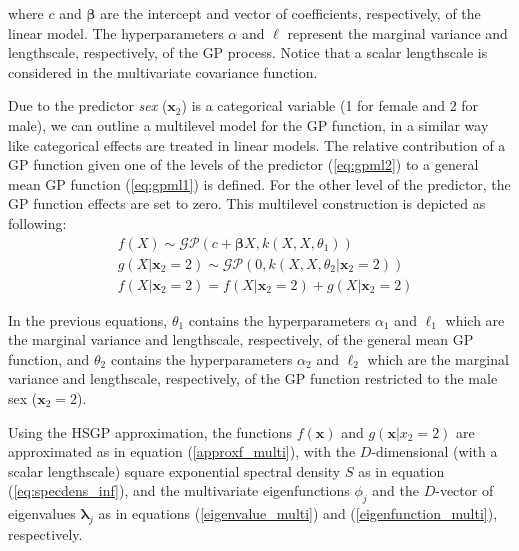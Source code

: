 \documentclass[]{interact}
\theoremstyle{plain}%
\theoremstyle{definition}
\theoremstyle{remark}
\begin{document}
\noindent where $c$ and $\bm{\beta}$ are the intercept and vector of coefficients, respectively, of the linear model. The hyperparameters $\alpha$ and $\ell$ represent the marginal variance and lengthscale, respectively, of the GP process. Notice that a scalar lengthscale is considered in the multivariate covariance function.

%

Due to the predictor \textit{sex} ($\bm{x}_2$) is a categorical variable (1 for female and 2 for male), we can outline a multilevel model for the GP function, in a similar way like categorical effects are treated in linear models. The relative contribution of a GP function given one of the levels of the predictor (\ref{eq:gpml2}) to a general mean GP function (\ref{eq:gpml1}) is defined. For the other level of the predictor, the GP function effects are set to zero. This multilevel construction is depicted as following:
%
\begin{eqnarray} 
&f(X) \sim \mathcal{GP}(c + \bm{\beta}X, k(X,X, \theta_1)) \label{eq:gpml1} \\
&g(X|\bm{x}_2=2) \sim \mathcal{GP}(0, k(X,X, \theta_2|\bm{x}_2=2)) \label{eq:gpml2} \\ 
&f(X|\bm{x}_2=2) = f(X|\bm{x}_2=2) + g(X|\bm{x}_2=2) \nonumber
\end{eqnarray}

\noindent In the previous equations, $\theta_1$ contains the hyperparameters $\alpha_1$ and $\ell_1$ which are the marginal variance and lengthscale, respectively, of the general mean GP function, and $\theta_2$ contains the hyperparameters $\alpha_2$ and $\ell_2$ which are the marginal variance and lengthscale, respectively, of the GP function restricted to the male sex ($\bm{x}_2=2$).

Using the HSGP approximation, the functions $f(\bm{x})$ and $g(\bm{x}|x_2=2)$ are approximated as in equation (\ref{approxf_multi}), with the $D$-dimensional (with a scalar lengthscale) square exponential spectral density $S$ as in equation (\ref{eq:specdens_inf}), and the multivariate eigenfunctions $\phi_j$ and the $D$-vector of eigenvalues $\bm{\lambda}_j$ as in equations (\ref{eigenvalue_multi}) and (\ref{eigenfunction_multi}), respectively.
\end{document}
